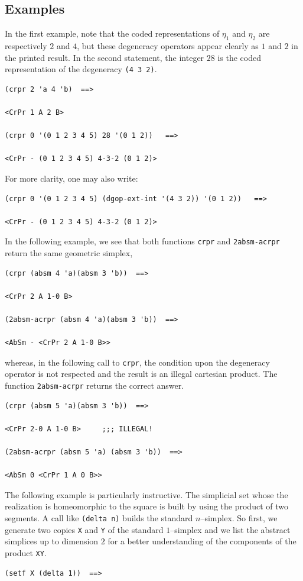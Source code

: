{\subsection* {Examples}

In the first example, note that the coded representations of $\eta_1$ and $\eta_2$ are
respectively $2$ and $4$, but these degeneracy operators appear clearly as $1$ and $2$ in the printed result.
In the second statement, the integer $28$ is the coded representation of the degeneracy {\tt (4 3 2)}.
{\footnotesize\begin{verbatim}
(crpr 2 'a 4 'b)  ==>

<CrPr 1 A 2 B>

(crpr 0 '(0 1 2 3 4 5) 28 '(0 1 2))   ==>

<CrPr - (0 1 2 3 4 5) 4-3-2 (0 1 2)>
\end{verbatim}}
For more clarity, one may also write:
{\footnotesize\begin{verbatim}
(crpr 0 '(0 1 2 3 4 5) (dgop-ext-int '(4 3 2)) '(0 1 2))   ==>

<CrPr - (0 1 2 3 4 5) 4-3-2 (0 1 2)>
\end{verbatim}}
In the following example, we see that both functions {\tt crpr} and
{\tt 2absm-acrpr} return the same geometric simplex,
{\footnotesize\begin{verbatim}
(crpr (absm 4 'a)(absm 3 'b))  ==>

<CrPr 2 A 1-0 B>

(2absm-acrpr (absm 4 'a)(absm 3 'b))  ==>

<AbSm - <CrPr 2 A 1-0 B>>
\end{verbatim}}
whereas, in the following call to {\tt crpr}, the condition upon the degeneracy
operator is not respected and the result is an illegal cartesian product.
The function {\tt 2absm-acrpr} returns the correct answer.
{\footnotesize\begin{verbatim}
(crpr (absm 5 'a)(absm 3 'b))  ==>

<CrPr 2-0 A 1-0 B>     ;;; ILLEGAL!

(2absm-acrpr (absm 5 'a) (absm 3 'b))  ==>

<AbSm 0 <CrPr 1 A 0 B>>
\end{verbatim}}
The following example is particularly instructive. The simplicial set
whose the realization is homeomorphic to the  square is built by using the product of two segments.
A call like {\tt (delta n)} builds  the standard $n$--simplex. So first, we generate
two copies {\tt X} and {\tt Y} of the standard $1$--simplex and we list the abstract simplices 
up to dimension $2$ for a better understanding of the components of the product {\tt XY}.
{\footnotesize\begin{verbatim}
(setf X (delta 1))  ==>


\end{verbatim}}}
